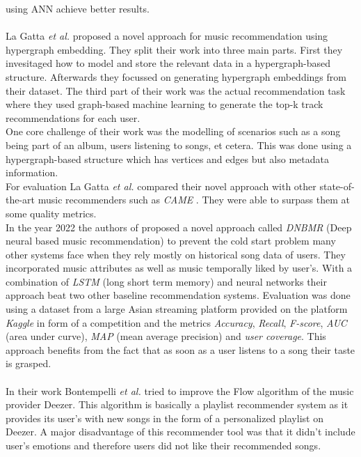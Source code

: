 \documentclass[runningheads,a4paper]{llncs}
\begin{document}
using ANN achieve better results. \cite{niyazov2021content}\\
\\
La Gatta \textit{et al.} proposed a novel approach for music recommendation using hypergraph embedding.
They split their work into three main parts.
First they invesitaged how to model and store the relevant data in a hypergraph-based structure.
Afterwards they focussed on generating hypergraph embeddings from their dataset.
The third part of their work was the actual recommendation task where they used graph-based machine learning to 
generate the top-k track recommendations for each user. \\
One core challenge of their work was the modelling of scenarios such as a song being part of an album, users listening to songs, et cetera.
This was done using a hypergraph-based structure which has vertices and edges but also metadata information.\\
For evaluation La Gatta \textit{et al.} compared their novel approach with other state-of-the-art music recommenders such as \textit{CAME} \cite{wang2020came}.
They were able to surpass them at some quality metrics. \cite{la2022music}
\\
In the year 2022 the authors of 
\cite{singh2022novel} proposed a novel approach called \textit{DNBMR} (Deep neural based music recommendation) 
to prevent the cold start problem many other systems face when they rely mostly on historical song data of users. 
They incorporated music attributes as well as music temporally liked by user's.
With a combination of \textit{LSTM} (long short term memory) and neural networks their approach beat two other baseline recommendation systems.
Evaluation was done using a dataset from a large Asian streaming platform provided on the platform \textit{Kaggle} in form of a competition and the metrics \textit{Accuracy}, \textit{Recall}, \textit{F-score},
\textit{AUC} (area under curve), \textit{MAP} (mean average precision) and \textit{user coverage}. This approach benefits from the fact that as soon as a user listens to a song their taste is grasped.\\
\\
In their work Bontempelli \textit{et al.} tried to improve the Flow algorithm of the music provider Deezer.
This algorithm is basically a playlist recommender system as it provides its user's with new songs in the form of a  personalized playlist on Deezer. 
A major disadvantage of this recommender tool was that it didn't include user's emotions and therefore users did not like their recommended songs.
\end{document}
